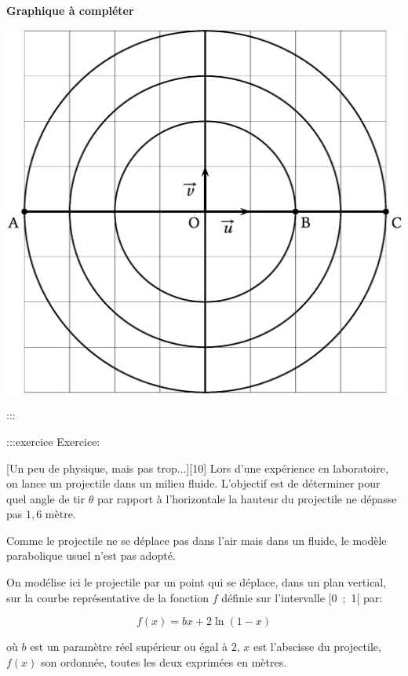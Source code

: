 \documentclass{cornouaille}
\begin{document}
\bigskip




\textbf{Graphique à compléter}

\bigskip


\includegraphics{./TS-Complexes-Loga-1}




:::

\newpage



:::exercice Exercice:

[Un peu de physique, mais pas trop...][10]
Lors d'une expérience en laboratoire, on lance un projectile dans un milieu fluide. L'objectif est de déterminer pour quel angle de tir
$\theta$ par rapport à l'horizontale la hauteur du projectile ne dépasse
pas $1,6$ mètre.

Comme le projectile ne se déplace pas dans l'air mais dans un
fluide, le modèle parabolique usuel n'est pas adopté.

On modélise ici le projectile par un point qui se déplace, dans un
plan vertical, sur la courbe représentative de la fonction $f$ définie
sur l'intervalle [0~;~1[ par:


$$
f(x) = bx + 2\ln (1- x)
$$


où $b$ est un paramètre réel supérieur ou égal à $2$, $x$ est l'abscisse
du projectile, $f(x)$ son ordonnée, toutes les deux exprimées en mètres.
\end{document}
